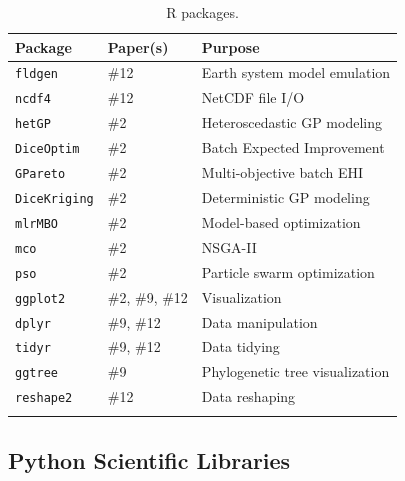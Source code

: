 \documentclass[11pt,letterpaper]{article}
\newcommand{\tool}[1]{\texttt{#1}}
\begin{document}
\begin{longtable}{l l p{7cm}}
\toprule
\textbf{Package} & \textbf{Paper(s)} & \textbf{Purpose} \\
\midrule
\tool{fldgen}      & \#12 & Earth system model emulation \\
\tool{ncdf4}       & \#12 & NetCDF file I/O \\
\tool{hetGP}       & \#2  & Heteroscedastic GP modeling \\
\tool{DiceOptim}   & \#2  & Batch Expected Improvement \\
\tool{GPareto}     & \#2  & Multi-objective batch EHI \\
\tool{DiceKriging} & \#2  & Deterministic GP modeling \\
\tool{mlrMBO}      & \#2  & Model-based optimization \\
\tool{mco}         & \#2  & NSGA-II \\
\tool{pso}         & \#2  & Particle swarm optimization \\
\tool{ggplot2}     & \#2, \#9, \#12 & Visualization \\
\tool{dplyr}       & \#9, \#12  & Data manipulation \\
\tool{tidyr}       & \#9, \#12  & Data tidying \\
\tool{ggtree}      & \#9  & Phylogenetic tree visualization \\
\tool{reshape2}    & \#12 & Data reshaping \\
\bottomrule
\caption{R packages.}
\end{longtable}

\subsection{Python Scientific Libraries}
\end{document}
